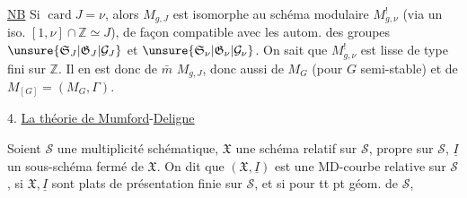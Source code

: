 \uline{NB} Si $\operatorname{card}J=\nu$, alors $M_{g,J}$ est isomorphe au schéma modulaire $M^!_{g,\nu}$ (via un iso. $[1,\nu]\cap\mathbb Z\simeq J$), de façon compatible avec les autom. des groupes $\unsure{\mathfrak S_J|\mathfrak G_J|\mathcal G_J}$ et $\unsure{\mathfrak S_\nu|\mathfrak G_\nu|\mathcal G_\nu}$. On sait que $M^!_{g,\nu}$ est lisse de type fini sur $\mathbb Z$. Il en est donc de $\bar m$  $M_{g,J}$, donc aussi de $M_G$ (pour $G$ semi-stable) et de $M_{[G]}=(M_G,\Gamma)$.

4. \uline{La théorie de Mumford}-\uline{Deligne}

Soient $\mathcal S$ une multiplicité schématique, $\mathfrak X$ une  schéma relatif sur $\mathcal S$, propre sur $\mathcal S$, $\underline I$ un sous-schéma fermé de $\mathfrak X$. On dit que $(\mathfrak X,\underline I)$ est une MD-courbe relative sur $\mathcal S$, si $\mathfrak X,\underline I$ sont plats de présentation finie sur $\mathcal S$, et si pour tt pt géom. de $\mathcal S$, 
